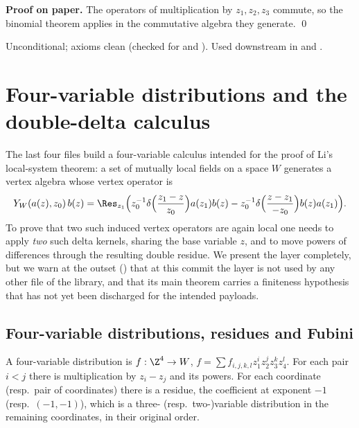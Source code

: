 \textbf{Proof on paper.} The operators of multiplication by $z_1,z_2,z_3$ commute, so the binomial theorem applies
in the commutative algebra they generate. \qed

\begin{status}
Unconditional; axioms clean (checked for  and ). Used downstream in
 and .
\end{status}

\section{Four-variable distributions and the double-delta calculus}\label{l01:sec:four}

The last four files build a four-variable calculus intended for the proof of Li's local-system theorem: a set of
mutually local fields on a space $W$ generates a vertex algebra whose vertex operator is
\begin{equation*}
  Y_W(a(z),z_0)\,b(z) = \Res_{z_1}\Big(z_0^{-1}\delta\Big(\frac{z_1-z}{z_0}\Big)a(z_1)b(z) -
  z_0^{-1}\delta\Big(\frac{z-z_1}{-z_0}\Big)b(z)a(z_1)\Big).
\end{equation*}
To prove that two such induced vertex operators are again local one needs to apply \emph{two} such delta kernels,
sharing the base variable $z$, and to move powers of differences through the resulting double residue. We present
the layer completely, but we warn at the outset () that at this commit the layer is not
used by any other file of the library, and that its main theorem carries a finiteness hypothesis that has not yet been
discharged for the intended payloads.

\subsection{Four-variable distributions, residues and Fubini}

\begin{definition}\label{l01:def:fd4}
A four-variable distribution is $f:\Z^4\to W$, $f = \sum f_{i,j,k,l}z_1^iz_2^jz_3^kz_4^l$. For each pair $i<j$ there is
multiplication by $z_i-z_j$ and its powers. For each coordinate (resp.\ pair of coordinates) there is a residue,
the coefficient at exponent $-1$ (resp.\ $(-1,-1)$), which is a three- (resp.\ two-)variable distribution in the
remaining coordinates, in their original order.
\end{definition}

